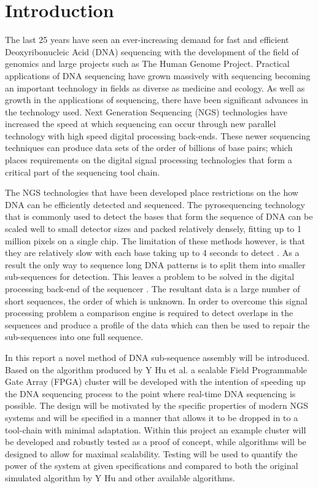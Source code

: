 \chapter{Introduction}
\renewcommand{\baselinestretch}{\mystretch}
\label{chap:Intro}
The last 25 years have seen an ever-increasing demand for fast and efficient Deoxyribonucleic Acid (DNA) sequencing with the development of the field of genomics and large projects such as The Human Genome Project. Practical applications of DNA sequencing have grown massively with sequencing becoming an important technology in fields as diverse as medicine and ecology. As well as growth in the applications of sequencing, there have been significant advances in the technology used. Next Generation Sequencing (NGS) technologies have increased the speed at which sequencing can occur through new parallel technology with high speed digital processing back-ends. These newer sequencing techniques can produce data sets of the order of billions of base pairs; which places requirements on the digital signal processing technologies that form a critical part of the sequencing tool chain.


The NGS technologies that have been developed place restrictions on the how DNA can be efficiently detected and sequenced. The pyrosequencing technology that is commonly used to detect the bases that form the sequence of DNA can be scaled well to small detector sizes and packed relatively densely, fitting up to 1 million pixels on a single chip. The limitation of these methods however, is that they are relatively slow with each base taking up to 4 seconds to detect \cite{rothberg2011integrated}. As a result the only way to sequence long DNA patterns is to split them into smaller sub-sequences for detection. This leaves a problem to be solved in the digital processing back-end of the sequencer \cite{shendure2008next}. The resultant data is a large number of short sequences, the order of which is unknown. In order to overcome this signal processing problem a comparison engine is required to detect overlaps in the sequences and produce a profile of the data which can then be used to repair the sub-sequences into one full sequence. 


In this report a novel method of DNA sub-sequence assembly will be introduced. Based on the algorithm produced by Y Hu et al. a scalable Field Programmable Gate Array (FPGA) cluster will be developed with the intention of speeding up the DNA sequencing process to the point where real-time DNA sequencing is possible. The design will be motivated by the specific properties of modern NGS systems and will be specified in a manner that allows it to be dropped in to a tool-chain with minimal adaptation. Within this project an example cluster will be developed and robustly tested as a proof of concept, while algorithms will be designed to allow for maximal scalability. Testing will be used to quantify the power of the system at given specifications and compared to both the original simulated algorithm by Y Hu and other available algorithms.


